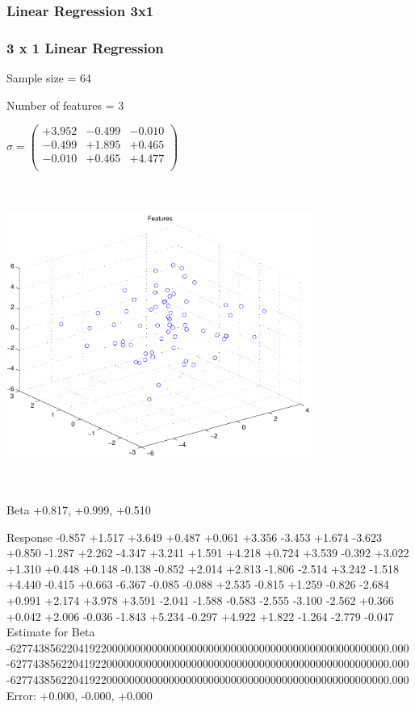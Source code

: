 \documentclass[9pt]{article}
\theoremstyle{plain}
\theoremstyle{definition}
\theoremstyle{remark}
\numberwithin{equation}{section}
\begin{document}
\subsubsection{Linear Regression 3x1}
\subsubsection{3 x 1 Linear Regression}
Sample size = 64

Number of features = 3

$\sigma = \left(
\begin{array}{
ccc}
+3.952 & -0.499 & -0.010 \\
-0.499 & +1.895 & +0.465 \\
-0.010 & +0.465 & +4.477 \\
\end{array}
\right)$ \newline 

\includegraphics[width=10.0cm,height=10.0cm]{regression_features.pdf}

Beta
+0.817, +0.999, +0.510

Response
-0.857
+1.517
+3.649
+0.487
+0.061
+3.356
-3.453
+1.674
-3.623
+0.850
-1.287
+2.262
-4.347
+3.241
+1.591
+4.218
+0.724
+3.539
-0.392
+3.022
+1.310
+0.448
+0.148
-0.138
-0.852
+2.014
+2.813
-1.806
-2.514
+3.242
-1.518
+4.440
-0.415
+0.663
-6.367
-0.085
-0.088
+2.535
-0.815
+1.259
-0.826
-2.684
+0.991
+2.174
+3.978
+3.591
-2.041
-1.588
-0.583
-2.555
-3.100
-2.562
+0.366
+0.042
+2.006
-0.036
-1.843
+5.234
-0.297
+4.922
+1.822
-1.264
-2.779
-0.047
Estimate for Beta
-6277438562204192200000000000000000000000000000000000000000000000000.000
-6277438562204192200000000000000000000000000000000000000000000000000.000
-6277438562204192200000000000000000000000000000000000000000000000000.000
Error:
+0.000, -0.000, +0.000
\end{document}
